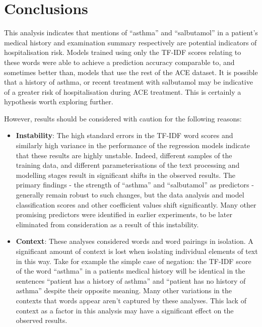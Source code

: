    \section{Conclusions}\label{sec:conclusions2}

   This analysis indicates that mentions of ``asthma'' and ``salbutamol'' in a patient's medical history and examination summary respectively are potential indicators of hospitalisation risk. Models trained using only the TF-IDF scores relating to these words were able to achieve a prediction accuracy comparable to, and sometimes better than, models that use the rest of the ACE dataset. It is possible that a history of asthma, or recent treatment with salbutamol may be indicative of a greater risk of hospitalisation during ACE treatment. This is certainly a hypothesis worth exploring further.

   However, results should be considered with caution for the following reasons:

   \begin{itemize}
       \item \textbf{Instability}: The high standard errors in the TF-IDF word scores and similarly high variance in the performance of the regression models indicate that these results are highly unstable. Indeed, different samples of the training data, and different parameterisations of the text processing and modelling stages result in significant shifts in the observed results. The primary findings - the strength of ``asthma'' and ``salbutamol'' as predictors - generally remain robust to such changes, but the data analysis and model classification scores and other coefficient values shift significantly. Many other promising predictors were identified in earlier experiments, to be later eliminated from consideration as a result of this instability.
       \item \textbf{Context}: These analyses considered words and word pairings in isolation. A significant amount of context is lost when isolating individual elements of text in this way. Take for example the simple case of negation: the TF-IDF score of the word ``asthma'' in a patients medical history will be identical  in the sentences ``patient has a history of asthma'' and ``patient has no history of asthma'' despite their opposite meaning. Many other variations in the contexts that words appear aren't captured by these analyses. This lack of context as a factor in this analysis may have a significant effect on the observed results.
   \end{itemize}